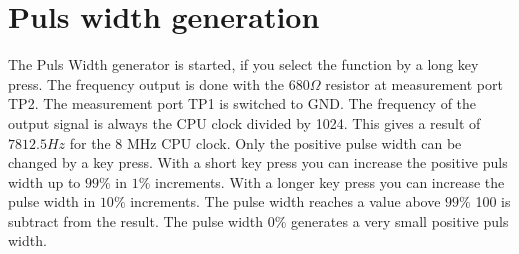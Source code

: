 \section{Puls width generation}
The Puls Width generator is started, if you select the  function by
a long key press.
The frequency output is done with the \(680\Omega\) resistor at measurement port TP2.
The measurement port TP1 is switched to GND.
The frequency of the output signal is always the CPU clock divided by 1024.
This gives a result of \(7812.5Hz\) for the 8 MHz CPU clock.
Only the positive pulse width can be changed by a key press. With a short key press
you can increase the positive puls width up to \(99\%\) in \(1\%\) increments.
With a longer key press you can increase the pulse width in \(10\%\) increments.
The pulse width reaches a value above \(99\%\) 100 is subtract from the result.
The pulse width \(0\%\) generates a very small positive puls width.

